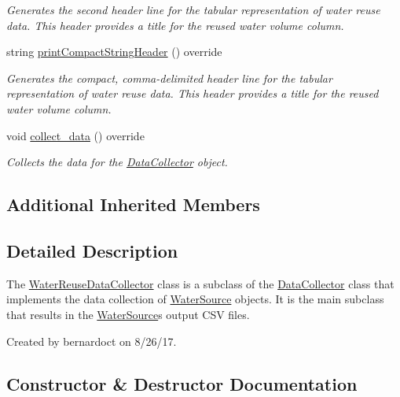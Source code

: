 \begin{DoxyCompactItemize}
\begin{DoxyCompactList}\small\item\em Generates the second header line for the tabular representation of water reuse data. This header provides a title for the reused water volume column. \end{DoxyCompactList}\item 
string \mbox{\hyperlink{classWaterReuseDataCollector_afef08bead3f2c60c2b9c975864456ef1}{print\+Compact\+String\+Header}} () override
\begin{DoxyCompactList}\small\item\em Generates the compact, comma-\/delimited header line for the tabular representation of water reuse data. This header provides a title for the reused water volume column. \end{DoxyCompactList}\item 
void \mbox{\hyperlink{classWaterReuseDataCollector_af4d8d437372c06d84ff889a5288cc96e}{collect\+\_\+data}} () override
\begin{DoxyCompactList}\small\item\em Collects the data for the \mbox{\hyperlink{classDataCollector}{Data\+Collector}} object. \end{DoxyCompactList}\end{DoxyCompactItemize}
\subsection*{Additional Inherited Members}


\subsection{Detailed Description}
The {\ttfamily \mbox{\hyperlink{classWaterReuseDataCollector}{Water\+Reuse\+Data\+Collector}}} class is a subclass of the {\ttfamily \mbox{\hyperlink{classDataCollector}{Data\+Collector}}} class that implements the data collection of \mbox{\hyperlink{classWaterSource}{Water\+Source}} objects. It is the main subclass that results in the \mbox{\hyperlink{classWaterSource}{Water\+Source}}\textquotesingle{}s output C\+SV files. 

Created by bernardoct on 8/26/17. 

\subsection{Constructor \& Destructor Documentation}
\mbox{\label{classWaterReuseDataCollector_a0bd64f585d6645023f6cf5a485a89416}} 
